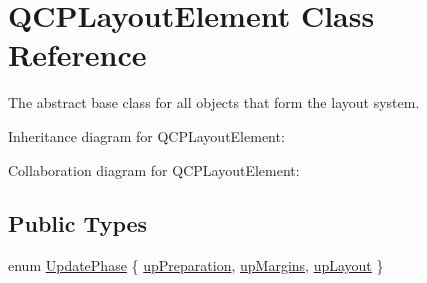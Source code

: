 \hypertarget{class_q_c_p_layout_element}{}\section{Q\+C\+P\+Layout\+Element Class Reference}
\label{class_q_c_p_layout_element}


The abstract base class for all objects that form the layout system.  




Inheritance diagram for Q\+C\+P\+Layout\+Element\+:


Collaboration diagram for Q\+C\+P\+Layout\+Element\+:
\subsection*{Public Types}
\begin{DoxyCompactItemize}
\item 
enum \hyperlink{class_q_c_p_layout_element_a0d83360e05735735aaf6d7983c56374d}{Update\+Phase} \{ \hyperlink{class_q_c_p_layout_element_a0d83360e05735735aaf6d7983c56374dad6119882eba136357c2f627992e527d3}{up\+Preparation}, 
\hyperlink{class_q_c_p_layout_element_a0d83360e05735735aaf6d7983c56374da288cb59a92280e47261a341f2813e676}{up\+Margins}, 
\hyperlink{class_q_c_p_layout_element_a0d83360e05735735aaf6d7983c56374da5d1ccf5d79967c232c3c511796860045}{up\+Layout}
 \}
\end{DoxyCompactItemize}
